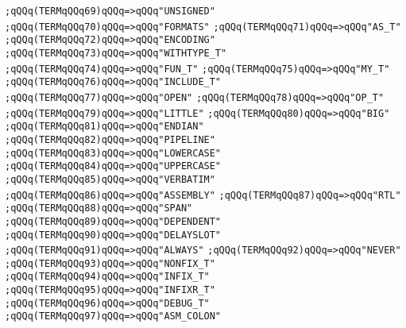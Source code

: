 \verb|;qQQq(TERMqQQq69)qQQq=>qQQq"UNSIGNED"|\newline
\verb|;qQQq(TERMqQQq70)qQQq=>qQQq"FORMATS"|\newline
\verb|;qQQq(TERMqQQq71)qQQq=>qQQq"AS_T"|\newline
\verb|;qQQq(TERMqQQq72)qQQq=>qQQq"ENCODING"|\newline
\verb|;qQQq(TERMqQQq73)qQQq=>qQQq"WITHTYPE_T"|\newline
\verb|;qQQq(TERMqQQq74)qQQq=>qQQq"FUN_T"|\newline
\verb|;qQQq(TERMqQQq75)qQQq=>qQQq"MY_T"|\newline
\verb|;qQQq(TERMqQQq76)qQQq=>qQQq"INCLUDE_T"|\newline
\verb|;qQQq(TERMqQQq77)qQQq=>qQQq"OPEN"|\newline
\verb|;qQQq(TERMqQQq78)qQQq=>qQQq"OP_T"|\newline
\verb|;qQQq(TERMqQQq79)qQQq=>qQQq"LITTLE"|\newline
\verb|;qQQq(TERMqQQq80)qQQq=>qQQq"BIG"|\newline
\verb|;qQQq(TERMqQQq81)qQQq=>qQQq"ENDIAN"|\newline
\verb|;qQQq(TERMqQQq82)qQQq=>qQQq"PIPELINE"|\newline
\verb|;qQQq(TERMqQQq83)qQQq=>qQQq"LOWERCASE"|\newline
\verb|;qQQq(TERMqQQq84)qQQq=>qQQq"UPPERCASE"|\newline
\verb|;qQQq(TERMqQQq85)qQQq=>qQQq"VERBATIM"|\newline
\verb|;qQQq(TERMqQQq86)qQQq=>qQQq"ASSEMBLY"|\newline
\verb|;qQQq(TERMqQQq87)qQQq=>qQQq"RTL"|\newline
\verb|;qQQq(TERMqQQq88)qQQq=>qQQq"SPAN"|\newline
\verb|;qQQq(TERMqQQq89)qQQq=>qQQq"DEPENDENT"|\newline
\verb|;qQQq(TERMqQQq90)qQQq=>qQQq"DELAYSLOT"|\newline
\verb|;qQQq(TERMqQQq91)qQQq=>qQQq"ALWAYS"|\newline
\verb|;qQQq(TERMqQQq92)qQQq=>qQQq"NEVER"|\newline
\verb|;qQQq(TERMqQQq93)qQQq=>qQQq"NONFIX_T"|\newline
\verb|;qQQq(TERMqQQq94)qQQq=>qQQq"INFIX_T"|\newline
\verb|;qQQq(TERMqQQq95)qQQq=>qQQq"INFIXR_T"|\newline
\verb|;qQQq(TERMqQQq96)qQQq=>qQQq"DEBUG_T"|\newline
\verb|;qQQq(TERMqQQq97)qQQq=>qQQq"ASM_COLON"|\newline
